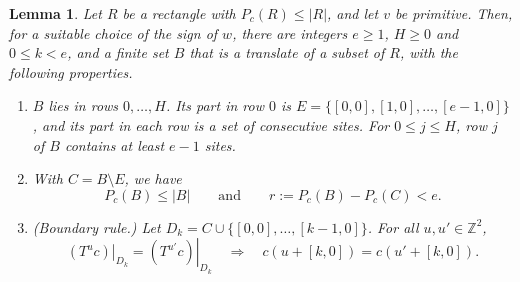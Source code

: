 \documentclass[11pt,a4paper,reqno]{amsart}
\newtheorem{lemma}[theorem]{Lemma}
\theoremstyle{definition}
\theoremstyle{remark}
\newcommand{\Z}{\mathbb Z}
\newcommand{\restr}[2]{\left.#1\right|_{#2}}
\newcommand{\rc}[2]{[#1,#2]}
\numberwithin{equation}{section}
\begin{document}
\begin{lemma}\label{lem:boundary-window}
Let $R$ be a rectangle with $P_c(R)\le|R|$, and let $v$ be primitive. Then, for a suitable choice of the sign of $w$, there are integers $e\ge1$, $H\ge0$ and $0\le k<e$, and a finite set $B$ that is a translate of a subset of $R$, with the following properties.
\begin{enumerate}
\item $B$ lies in rows $0,\ldots,H$. Its part in row $0$ is $E=\{\rc00,\rc10,\ldots,\rc{e-1}0\}$, and its part in each row is a set of consecutive sites. For $0\le j\le H$, row $j$ of $B$ contains at least $e-1$ sites.
\item With $C=B\setminus E$, we have
\[
 P_c(B)\le|B|\qquad\text{and}\qquad r:=P_c(B)-P_c(C)<e.
\]
\item \emph{(Boundary rule.)} Let $D_k=C\cup\{\rc00,\ldots,\rc{k-1}0\}$. For all $u,u'\in\Z^2$,
\[
 \restr{(T^uc)}{D_k}=\restr{(T^{u'}c)}{D_k}\quad\Longrightarrow\quad c(u+\rc k0)=c(u'+\rc k0).
\]
\end{enumerate}
\end{lemma}
\end{document}
